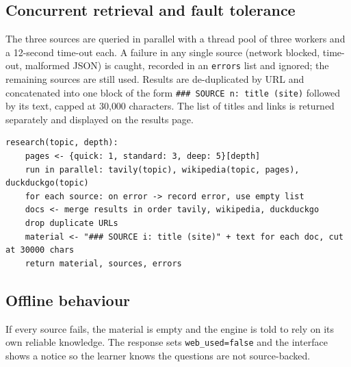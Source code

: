 \subsection{Concurrent retrieval and fault tolerance}
The three sources are queried in parallel with a thread pool of three workers and a 12-second time-out each. A failure in any single source (network blocked, time-out, malformed JSON) is caught, recorded in an \texttt{errors} list and ignored; the remaining sources are still used. Results are de-duplicated by URL and concatenated into one block of the form \texttt{\#\#\# SOURCE n: title (site)} followed by its text, capped at 30{,}000 characters. The list of titles and links is returned separately and displayed on the results page.

\begin{lstlisting}[style=pseudo, caption={Simplified logic of the research function}, label={lst:research}]
research(topic, depth):
    pages <- {quick: 1, standard: 3, deep: 5}[depth]
    run in parallel: tavily(topic), wikipedia(topic, pages), duckduckgo(topic)
    for each source: on error -> record error, use empty list
    docs <- merge results in order tavily, wikipedia, duckduckgo
    drop duplicate URLs
    material <- "### SOURCE i: title (site)" + text for each doc, cut at 30000 chars
    return material, sources, errors
\end{lstlisting}

\subsection{Offline behaviour}
If every source fails, the material is empty and the engine is told to rely on its own reliable knowledge. The response sets \texttt{web\_used=false} and the interface shows a notice so the learner knows the questions are not source-backed.


